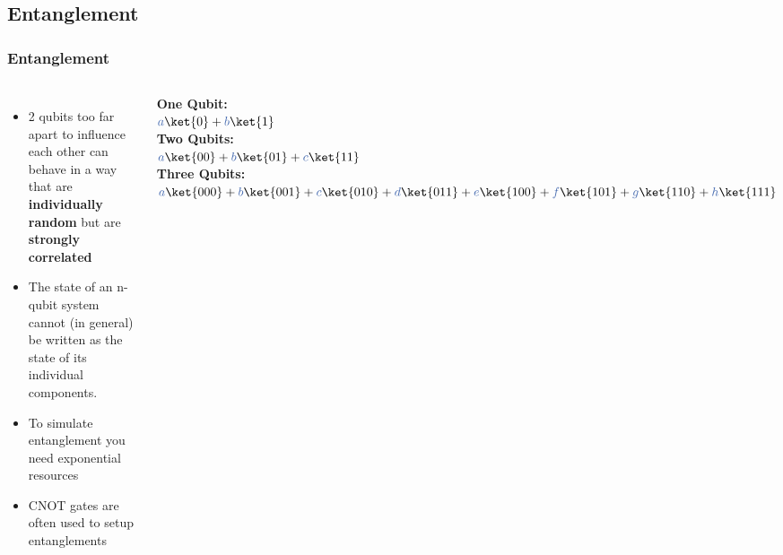 \documentclass[aspectratio=169,11pt,hyperref={colorlinks=true}]{beamer}
\begin{document}
\subsection{Entanglement}
\begin{frame}[noframenumbering]
    \frametitle{Entanglement}
    \begin{columns}
            \begin{itemize}
                \item 2 qubits too far apart to influence each other can behave in a way that are \textbf{individually random} but are \textbf{strongly correlated}
                \item The state of an n-qubit system cannot (in general) be written as the state of its individual components.
                \item To simulate entanglement you need exponential resources
                \item CNOT gates are often used to setup entanglements
            \end{itemize}
        \centering
            \textbf{One Qubit:}\\
            ${\color{ibm}a}\ket{0} + {\color{ibm}b}\ket{1}$\\
            \textbf{Two Qubits:}\\
            ${\color{ibm}a}\ket{00} + {\color{ibm}b}\ket{01} + {\color{ibm}c}\ket{11}$\\
            \textbf{Three Qubits:}\\
            ${\color{ibm}a}\ket{000} + {\color{ibm}b}\ket{001} + {\color{ibm}c}\ket{010} + {\color{ibm}d}\ket{011} + {\color{ibm}e}\ket{100} + {\color{ibm}f}\ket{101} + {\color{ibm}g}\ket{110} + {\color{ibm}h}\ket{111}$\\
    \end{columns}
\end{frame}
\end{document}

